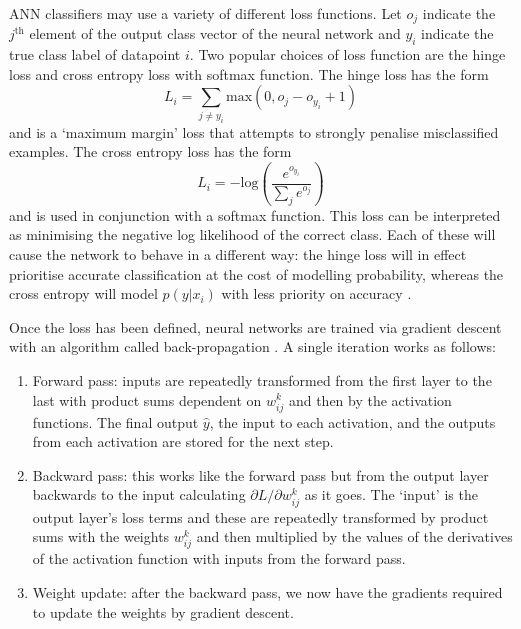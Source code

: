 ANN classifiers may use a variety of different loss functions. 
Let $o_{j}$ indicate the $j^{\mathrm{th}}$ element of the output class vector of the neural network and $y_{i}$ indicate the true class label of datapoint $i$. 
Two popular choices of loss function \cite{CS231n} are the hinge loss and cross entropy loss with softmax function.
The hinge loss has the form
\begin{equation}
    L_{i} = \sum_{j\neq{}y_{i}}\mathrm{max}(0,o_{j}-o_{y_{i}} + 1)
\end{equation}
and is a `maximum margin' loss that attempts to strongly penalise misclassified examples. 
The cross entropy loss has the form
\begin{equation}
    L_{i} = -\mathrm{log}\left(
        \frac{e^{o_{y_{i}}}}
        {\sum_{j}e^{o_{j}}}\right)
\end{equation}
and is used in conjunction with a softmax function. This loss can be interpreted as minimising the negative log likelihood of the correct class.
Each of these will cause the network to behave in a different way: the hinge loss will in effect prioritise accurate classification at the cost of modelling probability, whereas the cross entropy will model $p(y|x_{i})$ with less priority on accuracy \cite{CS231n}.

Once the loss has been defined, neural networks are trained via gradient descent with an algorithm called back-propagation \cite{Backprop}. A single iteration works as follows:
\begin{enumerate}[noitemsep]
    \item Forward pass: inputs are repeatedly transformed from the first layer to the last with product sums dependent on $w_{ij}^{k}$ and then by the activation functions. The final output $\hat{y}$, the input to each activation, and the outputs from each activation are stored for the next step. 
    \item Backward pass: this works like the forward pass but from the output layer backwards to the input calculating $\partial{L}/\partial{w_{ij}^{k}}$ as it goes. The `input' is the output layer's loss terms and these are repeatedly transformed by product sums with the weights $w_{ij}^{k}$ and then multiplied by the values of the derivatives of the activation function with inputs from the forward pass.  
    \item Weight update: after the backward pass, we now have the gradients required to update the weights by gradient descent.
\end{enumerate}


